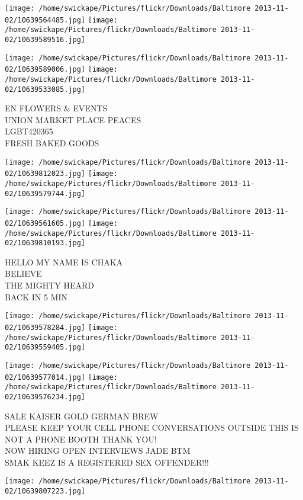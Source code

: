 \documentclass[10pt,letterpaper]{article}
\begin{document}
\texttt{[image: /home/swickape/Pictures/flickr/Downloads/Baltimore 2013-11-02/10639564485.jpg]}
\texttt{[image: /home/swickape/Pictures/flickr/Downloads/Baltimore 2013-11-02/10639589516.jpg]}

\texttt{[image: /home/swickape/Pictures/flickr/Downloads/Baltimore 2013-11-02/10639589006.jpg]}
\texttt{[image: /home/swickape/Pictures/flickr/Downloads/Baltimore 2013-11-02/10639533085.jpg]}

EN FLOWERS \& EVENTS\\
UNION MARKET PLACE PEACES\\
LGBT420365\\
FRESH BAKED GOODS\\
\pagebreak

\texttt{[image: /home/swickape/Pictures/flickr/Downloads/Baltimore 2013-11-02/10639812023.jpg]}
\texttt{[image: /home/swickape/Pictures/flickr/Downloads/Baltimore 2013-11-02/10639579744.jpg]}

\texttt{[image: /home/swickape/Pictures/flickr/Downloads/Baltimore 2013-11-02/10639561605.jpg]}
\texttt{[image: /home/swickape/Pictures/flickr/Downloads/Baltimore 2013-11-02/10639810193.jpg]}

HELLO MY NAME IS CHAKA\\
BELIEVE\\
THE MIGHTY HEARD\\
BACK IN 5 MIN\\
\pagebreak

\texttt{[image: /home/swickape/Pictures/flickr/Downloads/Baltimore 2013-11-02/10639578284.jpg]}
\texttt{[image: /home/swickape/Pictures/flickr/Downloads/Baltimore 2013-11-02/10639559405.jpg]}

\texttt{[image: /home/swickape/Pictures/flickr/Downloads/Baltimore 2013-11-02/10639577014.jpg]}
\texttt{[image: /home/swickape/Pictures/flickr/Downloads/Baltimore 2013-11-02/10639576234.jpg]}

SALE KAISER GOLD GERMAN BREW\\
PLEASE KEEP YOUR CELL PHONE CONVERSATIONS OUTSIDE THIS IS NOT A PHONE BOOTH THANK YOU!\\
NOW HIRING OPEN INTERVIEWS JADE BTM\\
SMAK KEEZ IS A REGISTERED SEX OFFENDER!!!\\
\pagebreak

\texttt{[image: /home/swickape/Pictures/flickr/Downloads/Baltimore 2013-11-02/10639807223.jpg]}
\end{document}

